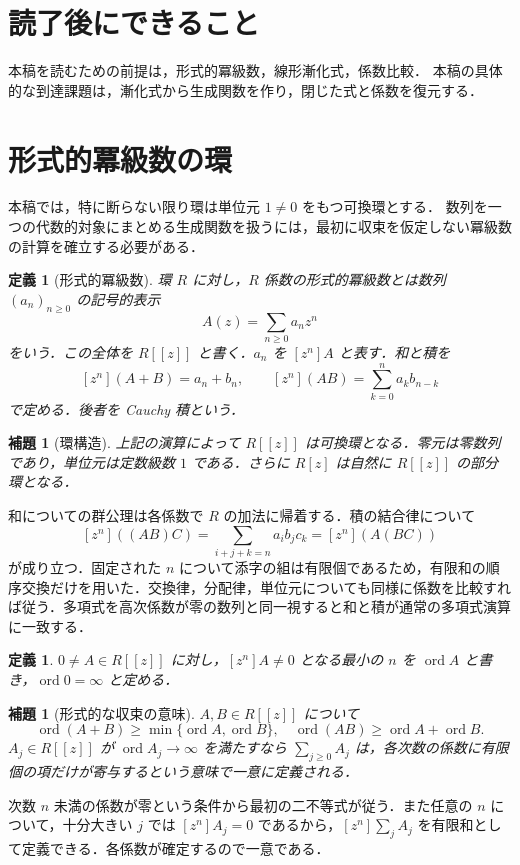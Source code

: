 \documentclass[a5paper,10pt,onecolumn]{jsarticle}
\makeatletter
\theoremstyle{mathnotetheorem}
\newtheorem{definition}[theorem]{定義}
\newtheorem{lemma}[theorem]{補題}
\renewcommand{\proofname}{証明}
\renewenvironment{proof}[1][\proofname]{%
  \par\pushQED{\qed}\normalfont\topsep4\p@\@plus2\p@\relax
  \trivlist\item[\hskip\labelsep\bfseries #1]\ignorespaces
}{\popQED\endtrivlist\@endpefalse}
\makeatother
\begin{document}
\section*{読了後にできること}
本稿を読むための前提は，形式的冪級数，線形漸化式，係数比較．
本稿の具体的な到達課題は，漸化式から生成関数を作り，閉じた式と係数を復元する．

\section{形式的冪級数の環}
本稿では，特に断らない限り環は単位元 $1\ne0$ をもつ可換環とする．
数列を一つの代数的対象にまとめる生成関数を扱うには，最初に収束を仮定しない冪級数の計算を確立する必要がある．

\begin{definition}[形式的冪級数]
環 $R$ に対し，$R$ 係数の\emph{形式的冪級数}とは数列 $(a_n)_{n\ge0}$ の記号的表示
\[
 A(z)=\sum_{n\ge0}a_nz^n
\]
をいう．この全体を $R[[z]]$ と書く．$a_n$ を $[z^n]A$ と表す．和と積を
\[
 [z^n](A+B)=a_n+b_n,\qquad
 [z^n](AB)=\sum_{k=0}^n a_kb_{n-k}
\]
で定める．後者を Cauchy 積という．
\end{definition}

\begin{lemma}[環構造]\label{lem:ring}
上記の演算によって $R[[z]]$ は可換環となる．零元は零数列であり，単位元は定数級数 $1$ である．さらに $R[z]$ は自然に $R[[z]]$ の部分環となる．
\end{lemma}
\begin{proof}
和についての群公理は各係数で $R$ の加法に帰着する．積の結合律について
\[
 [z^n]((AB)C)
 =\sum_{i+j+k=n}a_ib_jc_k=[z^n](A(BC))
\]
が成り立つ．固定された $n$ について添字の組は有限個であるため，有限和の順序交換だけを用いた．交換律，分配律，単位元についても同様に係数を比較すれば従う．多項式を高次係数が零の数列と同一視すると和と積が通常の多項式演算に一致する．
\end{proof}

\begin{definition}
$0\ne A\in R[[z]]$ に対し，$[z^n]A\ne0$ となる最小の $n$ を $\operatorname{ord}A$ と書き，$\operatorname{ord}0=\infty$ と定める．
\end{definition}
\begin{lemma}[形式的な収束の意味]\label{lem:orders}
$A,B\in R[[z]]$ について
\[
 \operatorname{ord}(A+B)\ge\min\{\operatorname{ord}A,\operatorname{ord}B\},\quad
 \operatorname{ord}(AB)\ge\operatorname{ord}A+\operatorname{ord}B.
\]
$A_j\in R[[z]]$ が $\operatorname{ord}A_j\to\infty$ を満たすなら
$\sum_{j\ge0}A_j$ は，各次数の係数に有限個の項だけが寄与するという意味で一意に定義される．
\end{lemma}
\begin{proof}
次数 $n$ 未満の係数が零という条件から最初の二不等式が従う．また任意の $n$ について，十分大きい $j$ では $[z^n]A_j=0$ であるから，$[z^n]\sum_j A_j$ を有限和として定義できる．各係数が確定するので一意である．
\end{proof}
\end{document}
